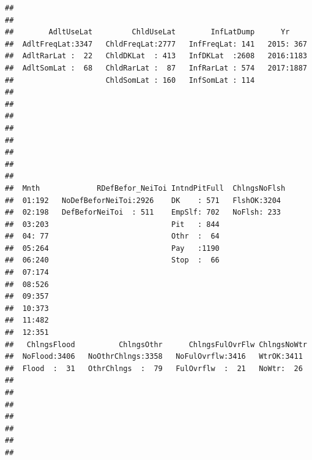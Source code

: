 \documentclass[11pt,]{article}
\begin{document}
\begin{verbatim}
##                                                                 
##                                                                 
##        AdltUseLat         ChldUseLat        InfLatDump      Yr      
##  AdltFreqLat:3347   ChldFreqLat:2777   InfFreqLat: 141   2015: 367  
##  AdltRarLat :  22   ChldDKLat  : 413   InfDKLat  :2608   2016:1183  
##  AdltSomLat :  68   ChldRarLat :  87   InfRarLat : 574   2017:1887  
##                     ChldSomLat : 160   InfSomLat : 114              
##                                                                     
##                                                                     
##                                                                     
##                                                                     
##                                                                     
##                                                                     
##                                                                     
##                                                                     
##  Mnth             RDefBefor_NeiToi IntndPitFull  ChlngsNoFlsh 
##  01:192   NoDefBeforNeiToi:2926    DK    : 571   FlshOK:3204  
##  02:198   DefBeforNeiToi  : 511    EmpSlf: 702   NoFlsh: 233  
##  03:203                            Pit   : 844                
##  04: 77                            Othr  :  64                
##  05:264                            Pay   :1190                
##  06:240                            Stop  :  66                
##  07:174                                                       
##  08:526                                                       
##  09:357                                                       
##  10:373                                                       
##  11:482                                                       
##  12:351                                                       
##   ChlngsFlood          ChlngsOthr      ChlngsFulOvrFlw ChlngsNoWtr 
##  NoFlood:3406   NoOthrChlngs:3358   NoFulOvrflw:3416   WtrOK:3411  
##  Flood  :  31   OthrChlngs  :  79   FulOvrflw  :  21   NoWtr:  26  
##                                                                    
##                                                                    
##                                                                    
##                                                                    
##                                                                    
##                                                                    
##                                                                    

\end{verbatim}
\end{document}
